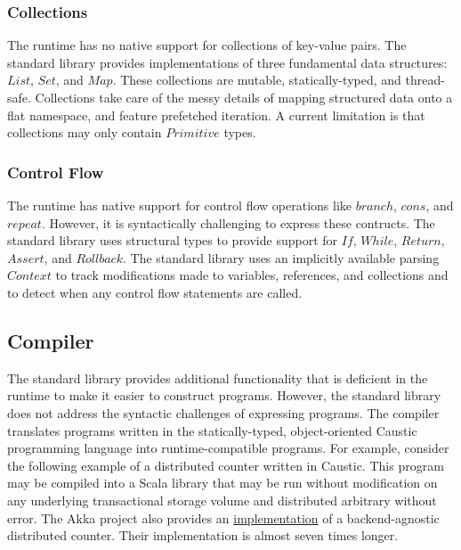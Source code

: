 \documentclass[../main.tex]{subfiles}
\begin{document}
    \subsubsection{Collections}
    The runtime has no native support for collections of key-value pairs. The standard library
    provides implementations of three fundamental data structures: $List$, $Set$, and $Map$. These
    collections are mutable, statically-typed, and thread-safe. Collections take care of the messy
    details of mapping structured data onto a flat namespace, and feature prefetched iteration. A
    current limitation is that collections may only contain $Primitive$ types.

    \subsubsection{Control Flow}
    The runtime has native support for control flow operations like $branch$, $cons$, and $repeat$.
    However, it is syntactically challenging to express these contructs. The standard library
    uses structural types to provide support for $If$, $While$, $Return$, $Assert$, and $Rollback$.
    The standard library uses an implicitly available parsing $Context$ to track modifications made
    to variables, references, and collections and to detect when any control flow statements are
    called.

  \subsection{Compiler}
  The standard library provides additional functionality that is deficient in the runtime to make it
  easier to construct programs. However, the standard library does not address the syntactic
  challenges of expressing programs. The compiler translates programs written in the
  statically-typed, object-oriented Caustic programming language into runtime-compatible programs.
  For example, consider the following example of a distributed counter written in Caustic. This
  program may be compiled into a Scala library that may be run without modification on any
  underlying transactional storage volume and distributed arbitrary without error. The Akka project
  also provides an \href{https://git.io/vxS6u}{implementation} of a backend-agnostic distributed
  counter. Their implementation is almost seven times longer.
\end{document}
